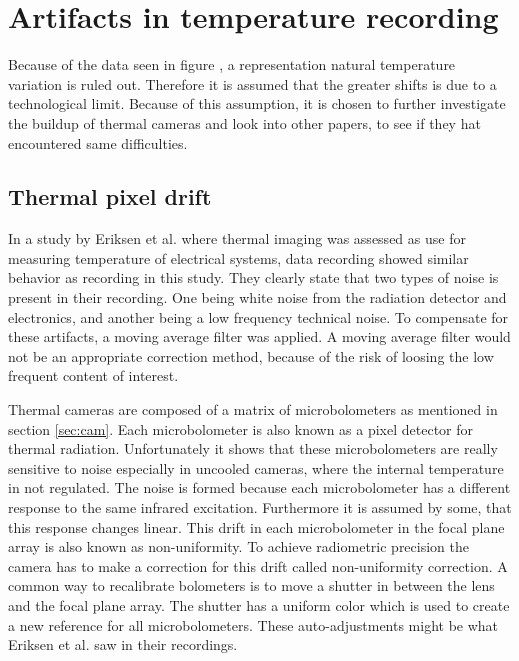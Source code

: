 \section{Artifacts in temperature recording}


Because of the data seen in figure , a representation natural temperature variation is ruled out. Therefore it is assumed that the greater shifts is due to a technological limit. Because of this assumption, it is chosen to further investigate the buildup of thermal cameras and look into other papers, to see if they hat encountered same difficulties.

\subsection{Thermal pixel drift}

In a study by Eriksen et al. where thermal imaging was assessed as use for measuring temperature of electrical systems, data recording showed similar behavior as recording in this study. They clearly state that two types of noise is present in their recording. One being white noise from the radiation detector and electronics, and another being a low frequency technical noise. To compensate for these artifacts, a moving average filter was applied.\cite{eriksen2014} A moving average filter would not be an appropriate correction method, because of the risk of loosing the low frequent content of interest. 


Thermal cameras are composed of a matrix of microbolometers as mentioned in section \cref{sec:cam}. Each microbolometer is also known as a pixel detector for thermal radiation.\cite{olbrycht2015,wolf2016} Unfortunately it shows that these microbolometers are really sensitive to noise especially in uncooled cameras, where the internal temperature in not regulated. The noise is formed because each microbolometer has a different response to the same infrared excitation. Furthermore it is assumed by some, that this response changes linear\cite{olbrycht2015}. This drift in each microbolometer in the focal plane array is also known as non-uniformity. To achieve radiometric precision the camera has to make a correction for this drift called non-uniformity correction. A common way to recalibrate bolometers is to move a shutter in between the lens and the focal plane array. The shutter has a uniform color which is used to create a new reference for all microbolometers.\cite{olbrycht2015,wolf2016} These auto-adjustments might be what Eriksen et al. saw in their recordings. 




